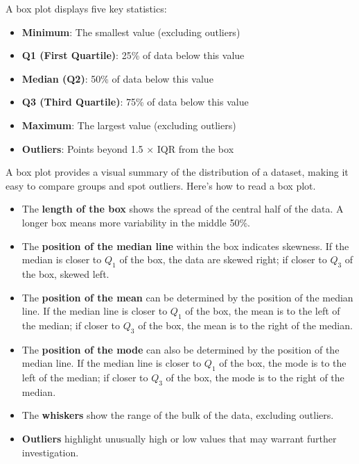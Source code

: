 \begin{definition}
A box plot displays five key statistics:
\begin{itemize}
    \item \textbf{Minimum}: The smallest value (excluding outliers)
    \item \textbf{Q1 (First Quartile)}: 25\% of data below this value
    \item \textbf{Median (Q2)}: 50\% of data below this value
    \item \textbf{Q3 (Third Quartile)}: 75\% of data below this value
    \item \textbf{Maximum}: The largest value (excluding outliers)
    \item \textbf{Outliers}: Points beyond 1.5 × IQR from the box
\end{itemize}
\end{definition}

A box plot provides a visual summary of the distribution of a dataset, making it easy to compare groups and spot outliers. Here's how to read a box plot.

\begin{itemize}
    \item The \textbf{length of the box} shows the spread of the central half of the data. A longer box means more variability in the middle 50\%.
    \item The \textbf{position of the median line} within the box indicates skewness. If the median is closer to $Q_1$ of the box, the data are skewed right; if closer to $Q_3$ of the box, skewed left.
    \item The \textbf{position of the mean} can be determined by the position of the median line. If the median line is closer to $Q_1$ of the box, the mean is to the left of the median; if closer to $Q_3$ of the box, the mean is to the right of the median.
    \item The \textbf{position of the mode} can also be determined by the position of the median line. If the median line is closer to $Q_1$ of the box, the mode is to the left of the median; if closer to $Q_3$ of the box, the mode is to the right of the median.
    \item The \textbf{whiskers} show the range of the bulk of the data, excluding outliers.
    \item \textbf{Outliers} highlight unusually high or low values that may warrant further investigation.
\end{itemize}

